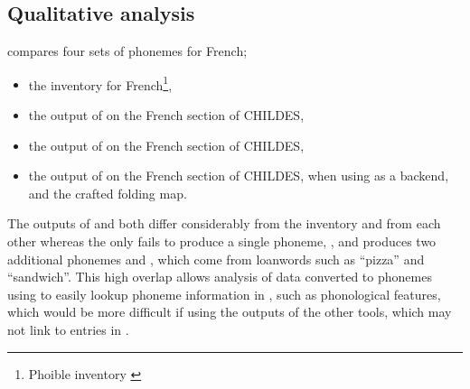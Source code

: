 



\subsection{Qualitative analysis}\label{sec:13-qualitative}


 compares four sets of phonemes for French;
\begin{itemize}
\item the \phoible inventory for French\footnote{Phoible inventory \href{https://phoible.org/inventories/view/2269}{}},
\item the output of \phonemizer on the French section of CHILDES,
\item the output of \epitran on the French section of CHILDES,
\item the output of \gpp on the French section of CHILDES, when using \phonemizer as a backend, and the crafted folding map.
\end{itemize}

The outputs of \phonemizer and \epitran both differ considerably from the \phoible inventory and from each other whereas the \gpp only fails to produce a single phoneme, \ttipa{\textturnh}, and produces two additional phonemes  and , which come from loanwords such as ``pizza'' and ``sandwich''. This high overlap allows analysis of data converted to phonemes using \gpp to easily lookup phoneme information in \phoible, such as phonological features, which would be more difficult if using the outputs of the other tools, which may not link to entries in \phoible.

